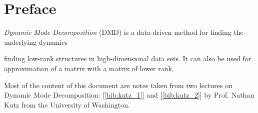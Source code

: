 \documentclass[10pt,twocolumn]{article}
\begin{document}

\setlength{\parindent}{0cm}

\vspace{10mm}

\setlength{\parindent}{0cm}

\fontsize{14}{10}\selectfont {Kamila Zdybał}

\vspace{2mm}

\fontsize{8}{10}

\fontsize{8}{10}

\section*{Preface}

\textit{Dynamic Mode Decomposition} (DMD) is a data-driven method for finding the underlying dynamics 

 finding low-rank structures in high-dimensional data sets. It can also be used for approximation of a matrix with a matrix of lower rank.

Most of the content of this document are notes taken from two lectures on Dynamic Mode Decomposition: [\ref{bib:kutz_1}] and [\ref{bib:kutz_2}] by Prof. Nathan Kutz from the University of Washington. 
\end{document}
